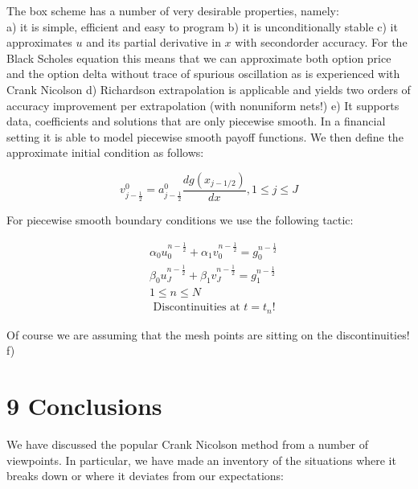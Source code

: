 \documentclass[10pt]{article}
\begin{document}
The box scheme has a number of very desirable properties, namely:\\
a) it is simple, efficient and easy to program b) it is unconditionally stable c) it approximates $u$ and its partial derivative in $x$ with secondorder accuracy. For the Black Scholes equation this means that we can approximate both option price and the option delta without trace of spurious oscillation as is experienced with Crank Nicolson d) Richardson extrapolation is applicable and yields two orders of accuracy improvement per extrapolation (with nonuniform nets!) e) It supports data, coefficients and solutions that are only piecewise smooth. In a financial setting it is able to model piecewise smooth payoff functions. We then define the approximate initial condition as follows:


\begin{equation*}
v_{j-\frac{1}{2}}^{0}=a_{j-\frac{1}{2}}^{0} \frac{d g\left(x_{j-1 / 2}\right)}{d x}, 1 \leq j \leq J \tag{23}
\end{equation*}


For piecewise smooth boundary conditions we use the following tactic:


\begin{align*}
& \alpha_{0} u_{0}^{n-\frac{1}{2}}+\alpha_{1} v_{0}^{n-\frac{1}{2}}=g_{0}^{n-\frac{1}{2}} \\
& \beta_{0} u_{J}^{n-\frac{1}{2}}+\beta_{1} v_{J}^{n-\frac{1}{2}}=g_{1}^{n-\frac{1}{2}}  \tag{24}\\
& 1 \leq n \leq N \\
& \text { Discontinuities at } t=t_{n}!
\end{align*}


Of course we are assuming that the mesh points are sitting on the discontinuities! f)

\section*{9 Conclusions}
We have discussed the popular Crank Nicolson method from a number of viewpoints. In particular, we have made an inventory of the situations where it breaks down or where it deviates from our expectations:
\end{document}
